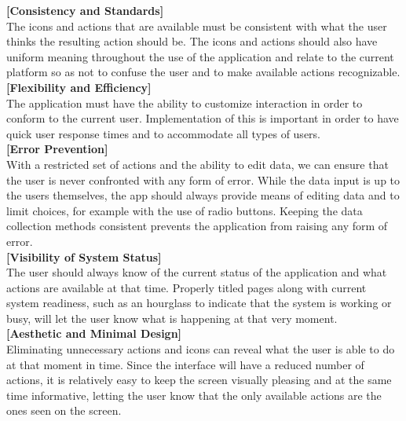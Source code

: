 \documentclass[pdftex,12pt,a4paper]{report}
\begin{document}
\noindent\textbf{[Consistency and Standards]}
\vspace{0.2cm}
\\The icons and actions that are available must be consistent with what the user thinks
the resulting action should be. The icons and actions should also have uniform
meaning throughout the use of the application and relate to the current platform
so as not to confuse the user and to make available actions recognizable.
\pagebreak
\\\textbf{[Flexibility and Efficiency]}
\vspace{0.3cm}
\\The application must have the ability to customize interaction in order to conform
to the current user. Implementation of this is important in order to have quick user
response times and to accommodate all types of users.
\vspace{0.7cm}
\\\textbf{[Error Prevention]}
\vspace{0.3cm}
\\With a restricted set of actions and the ability to edit data, we can ensure that
the user is never confronted with any form of error. While the data input is up to
the users themselves, the app should always provide means of editing data and to
limit choices, for example with the use of radio buttons. Keeping the data collection
methods consistent prevents the application from raising any form of error.
\vspace{0.7cm}
\\\textbf{[Visibility of System Status]}
\vspace{0.3cm}
\\The user should always know of the current status of the application and what
actions are available at that time. Properly titled pages along with current system
readiness, such as an hourglass to indicate that the system is working or busy, will
let the user know what is happening at that very moment.
\vspace{0.7cm}
\\\textbf{[Aesthetic and Minimal Design]}
\vspace{0.3cm}
\\Eliminating unnecessary actions and icons can reveal what the user is able to do at
that moment in time. Since the interface will have a reduced number of actions, it is
relatively easy to keep the screen visually pleasing and at the same time informative,
letting the user know that the only available actions are the ones seen on the screen.
\end{document}
